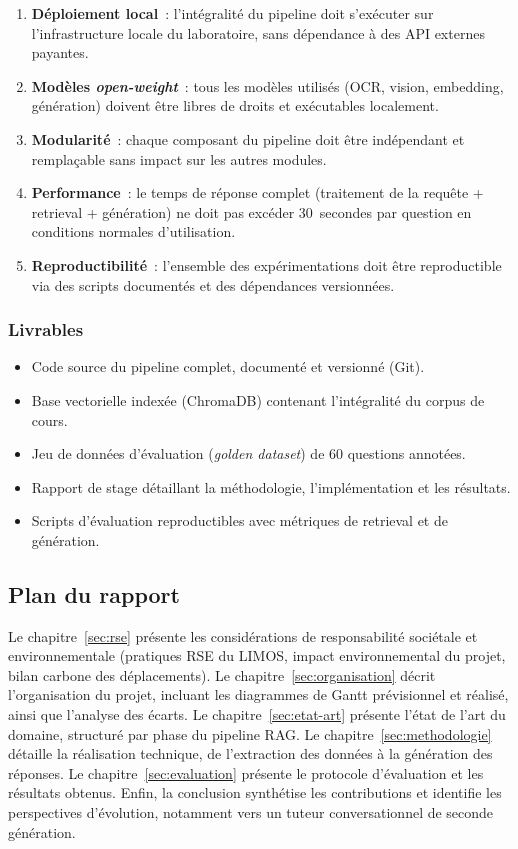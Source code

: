 \documentclass[11pt,a4paper]{article}
\begin{document}
\begin{enumerate}
  \item \textbf{Déploiement local}~: l'intégralité du pipeline doit s'exécuter sur l'infrastructure locale du laboratoire, sans dépendance à des API externes payantes.
  \item \textbf{Modèles \textit{open-weight}}~: tous les modèles utilisés (OCR, vision, embedding, génération) doivent être libres de droits et exécutables localement.
  \item \textbf{Modularité}~: chaque composant du pipeline doit être indépendant et remplaçable sans impact sur les autres modules.
  \item \textbf{Performance}~: le temps de réponse complet (traitement de la requête + retrieval + génération) ne doit pas excéder 30~secondes par question en conditions normales d'utilisation.
  \item \textbf{Reproductibilité}~: l'ensemble des expérimentations doit être reproductible via des scripts documentés et des dépendances versionnées.
\end{enumerate}

\subsubsection{Livrables}

\begin{itemize}
  \item Code source du pipeline complet, documenté et versionné (Git).
  \item Base vectorielle indexée (ChromaDB) contenant l'intégralité du corpus de cours.
  \item Jeu de données d'évaluation (\textit{golden dataset}) de 60 questions annotées.
  \item Rapport de stage détaillant la méthodologie, l'implémentation et les résultats.
  \item Scripts d'évaluation reproductibles avec métriques de retrieval et de génération.
\end{itemize}

\subsection{Plan du rapport}

Le chapitre~\ref{sec:rse} présente les considérations de responsabilité sociétale et environnementale (pratiques RSE du LIMOS, impact environnemental du projet, bilan carbone des déplacements). Le chapitre~\ref{sec:organisation} décrit l'organisation du projet, incluant les diagrammes de Gantt prévisionnel et réalisé, ainsi que l'analyse des écarts. Le chapitre~\ref{sec:etat-art} présente l'état de l'art du domaine, structuré par phase du pipeline RAG. Le chapitre~\ref{sec:methodologie} détaille la réalisation technique, de l'extraction des données à la génération des réponses. Le chapitre~\ref{sec:evaluation} présente le protocole d'évaluation et les résultats obtenus. Enfin, la conclusion synthétise les contributions et identifie les perspectives d'évolution, notamment vers un tuteur conversationnel de seconde génération.
\end{document}
